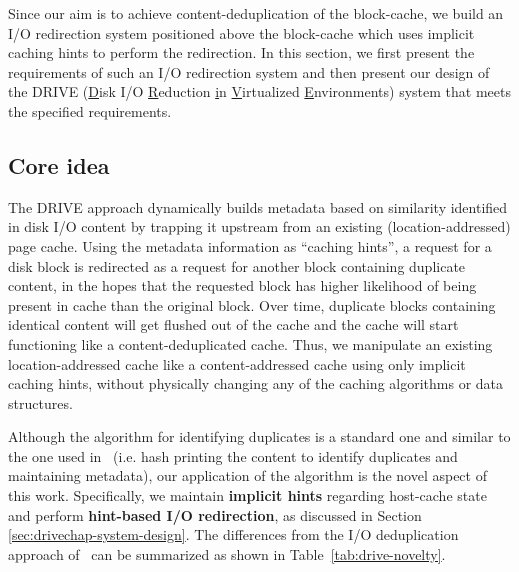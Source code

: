 
Since our aim is to achieve content-deduplication of the block-cache,
we build an I/O redirection system positioned above the block-cache
which uses implicit caching hints to perform the redirection.
In this section, we first present the requirements of such an I/O redirection 
system and then present our design of the DRIVE (\underline{D}isk I/O
\underline{R}eduction \underline{i}n \underline{V}irtualized 
\underline{E}nvironments) system that meets the specified
requirements.

\subsection{Core idea}
The DRIVE approach dynamically builds metadata based on
similarity identified in disk I/O content by trapping it
upstream from an existing (location-addressed) page cache. Using
the metadata information as ``caching hints'', a request
for a disk block is redirected as a request for
another block containing duplicate content, in the hopes
that the requested block has higher likelihood of being
present in cache than the original block. Over time, duplicate
blocks containing identical content will get flushed out
of the cache and the cache will start functioning like a
content-deduplicated cache. Thus, we manipulate an existing
location-addressed cache like a content-addressed cache using only
implicit caching hints, without physically changing any
of the caching algorithms or data structures.

Although the algorithm for identifying duplicates is a standard 
one and similar to the one used in~\cite{iodedup} (i.e. hash printing 
the content to identify duplicates and maintaining metadata), our 
application of the algorithm is the novel aspect of this work. 
Specifically, we maintain \textbf{implicit hints} regarding 
host-cache state and perform \textbf{hint-based I/O redirection}, 
as discussed in Section \ref{sec:drivechap-system-design}.
The differences from the I/O deduplication approach of~\cite{iodedup} 
can be summarized as shown in Table~\ref{tab:drive-novelty}.

